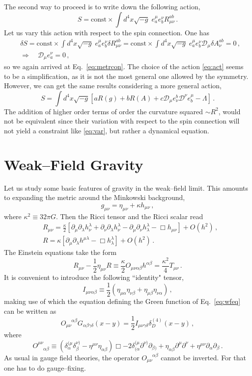 \documentclass[11pt,a4paper]{article}
\newcommand{\be}{\begin{equation}}
\newcommand{\ee}{\end{equation}}
\newcommand\m{\mu}
\newcommand\g{\gamma}
\newcommand\D{\Delta}
\newcommand\n{\nu}
\renewcommand\a{\alpha}
\renewcommand\b{\beta}
\renewcommand\l{\lambda}
\def\d{\partial}
\renewcommand{\D}{\mathcal{D}}
\begin{document}
The second way to proceed is to write down the following action,
\be
\label{eq:act}
S=\mathrm{const}\times \int d^4x \sqrt{-g}\; e_a^\m e_b^\n R_{\m \n}^{ab}\,.
\ee
Let us vary this action with respect to the spin connection. One has
\be
\label{eq:var}
\begin{split}
&\delta S=\mathrm{const}\times \int d^4x \sqrt{-g}\; e_a^\m e_b^\n\delta R_{\m \n}^{ab}=
\mathrm{const}\times \int d^4x \sqrt{-g}\; e_a^\m e_b^\n\D_{\m}\delta A_\nu^{ab}=0\,,\\
&\Rightarrow \quad
\D_{\m}e_a^\n =0\,,
\end{split}
\ee
so we again arrived at Eq.~\eqref{eq:metrcon}.
The choice of the action \eqref{eq:act} seems to be a simplification, as it is not the most general one allowed by the
symmetry. However, we can
get the same results considering a more general action,
\be
S=\int d^4 x\sqrt{-g} [aR(g)+bR(A)+c\D_\m e^{b}_\nu\D^\n e_{b}^{\m}-\Lambda]\,.
\ee
The addition of higher order terms of order the curvature squared $\sim R^2$, would not be equivalent since their variation with respect to the spin connection
will not yield a constraint like \eqref{eq:var}, but rather a dynamical equation.


\section{Weak--Field Gravity}
\label{sec:weak}

Let us study some basic features of gravity in the weak--field limit.
This amounts to expanding the metric around the Minkowski background,
\be
\label{eq:metrics}
g_{\m \n}=\eta_{\m \n}+\kappa h_{\m \nu} \,,
\ee
where $\kappa^2\equiv 32 \pi G$. Then the Ricci tensor and the Ricci scalar read
\be
\begin{split}
& R_{\m \n} =\frac{\kappa}{2}\left[\d_\m \d_\l h_\n^\l +\d_\n \d_\l h^\l_\n -\d_\m \d_\n h^\l_\l -\Box h_{\m \n}\right]+O(h^2)\,,\\
& R =\kappa\left[\d_\m \d_\l h^{\m\l} -\Box h^{\l}_{\l}\right]+O(h^2)\,.
\end{split}
\ee
The Einstein equations take the form
\be
\label{eq:wfeq}
R_{\m\n}-\frac{1}{2}\eta_{\m \n}R\equiv \frac{\kappa}{2}O_{\m\n\a\b}h^{\a \b} =\frac{\kappa^2}{4}T_{\m \n}\,.
\ee
It is convenient to introduce the following ``identity" tensor,
\be
I_{\m \n \a \b}\equiv \frac{1}{2}(\eta_{\m \a}\eta_{\n \b}+\eta_{\m \b}\eta_{\n \a})\,,
\ee
making use of which the equation defining the Green function of Eq.~\eqref{eq:wfeq}
can be written as
\be
\label{eq:green}
O_{\m \n}^{\; \; \; \; \a \b} G_{\a\b\g\delta}(x-y)=\frac{1}{2}I_{\m \n \g \delta}\delta^{(4)}_{D}(x-y)\,,
\ee
where
\be
 O^{\m \n}_{\; \; \; \; \a \b}\equiv (\delta^{(\m}_\a\delta^{\n)}_\b-\eta^{\m\n}\eta_{\a\b})\Box
 -2\delta^{(\m}_{(\a} \d^{\n)}\d_{\b)}+\eta_{\a \b}\d^\m\d^\n+\eta^{\m \n}\d_\a\d_\b\,.
\ee
As usual in gauge field theories, the operator $O_{\m \n}^{\; \; \; \; \a \b}$
cannot be inverted. For that one has to do gauge--fixing.
\end{document}
